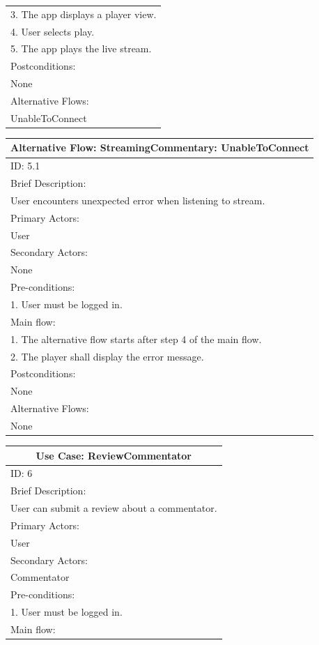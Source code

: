 \documentclass{article}
\begin{document}
\begin{flushleft}
\begin{longtable}[l]{|l|}
3. The app displays a player view.\\
4. User selects play.\\
5. The app plays the live stream.\\
\hline
Postconditions:\\
None\\
\hline
Alternative Flows:\\
UnableToConnect\\
\hline
\end{longtable}
\begin{longtable}[l]{|l|}
\hline
Alternative Flow: StreamingCommentary: UnableToConnect\\
\hline
ID: 5.1\\
\hline
Brief Description: \\
User encounters unexpected error when listening to stream.\\
\hline
Primary Actors:\\
User\\
\hline
Secondary Actors:\\
None\\
\hline
Pre-conditions:\\
1. User must be logged in.\\
\hline
Main flow:\\
1. The alternative flow starts after step 4 of the main flow.\\
2. The player shall display the error message.\\
\hline
Postconditions:\\
None\\
\hline
Alternative Flows:\\
None\\
\hline
\end{longtable}
\begin{longtable}[l]{|l|}
\hline
\multicolumn{1}{|c|}{Use Case: ReviewCommentator}\\
\hline
ID: 6\\
\hline
Brief Description: \\
User can submit a review about a commentator.\\
\hline
Primary Actors:\\
User\\
\hline
Secondary Actors:\\
Commentator\\
\hline
Pre-conditions:\\
1. User must be logged in.\\
\hline
Main flow:\\

\end{longtable}
\end{flushleft}
\end{document}
